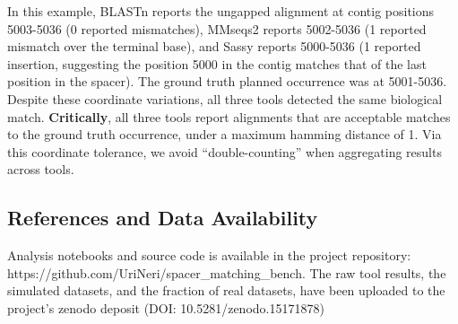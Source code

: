 \documentclass[
]{article}
\begin{document}
In this example, BLASTn reports the ungapped alignment at contig
positions 5003-5036 (0 reported mismatches), MMseqs2 reports 5002-5036
(1 reported mismatch over the terminal base), and Sassy reports
5000-5036 (1 reported insertion, suggesting the position 5000 in the
contig matches that of the last position in the spacer). The ground
truth planned occurrence was at 5001-5036. Despite these coordinate
variations, all three tools detected the same biological match.
\textbf{Critically}, all three tools report alignments that are
acceptable matches to the ground truth occurrence, under a maximum
hamming distance of 1. Via this coordinate tolerance, we avoid
``double-counting'' when aggregating results across tools.

\subsection{References and Data
Availability}\label{references-and-data-availability}

Analysis notebooks and source code is available in the project
repository: https://github.com/UriNeri/spacer\_matching\_bench. The raw
tool results, the simulated datasets, and the fraction of real datasets,
have been uploaded to the project's zenodo deposit (DOI:
10.5281/zenodo.15171878)


\printbibliography
\end{document}

